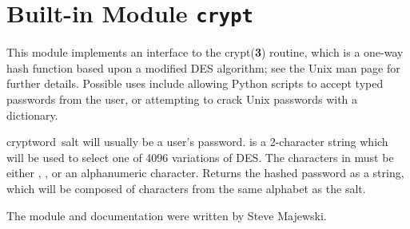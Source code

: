 \section{Built-in Module {\tt crypt}}
\label{module-crypt}

This module implements an interface to the crypt({\bf 3}) routine,
which is a one-way hash function based upon a modified DES algorithm;
see the Unix man page for further details.  Possible uses include
allowing Python scripts to accept typed passwords from the user, or
attempting to crack Unix passwords with a dictionary.

\renewcommand{\indexsubitem}{(in module crypt)}
\begin{funcdesc}{crypt}{word\, salt} 
 will usually be a user's password.   is a
2-character string which will be used to select one of 4096 variations
of DES.  The characters in  must be either ,
\code{/}, or an alphanumeric character.  Returns the hashed password
as a string, which will be composed of characters from the same
alphabet as the salt.
\end{funcdesc}

The module and documentation were written by Steve Majewski.
